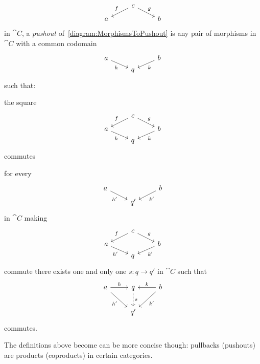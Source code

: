\begin{definition}
  \begin{equation}
    \begin{tikzcd}[row sep=tiny]
      & c \ar["f", dl, swap] \ar["g", dr] & \\
      a & & b
    \end{tikzcd}
    \label{diagram:MorphismsToPushout}\end{equation}
  in \(\cat C\), a {\em pushout} of~\eqref{diagram:MorphismsToPushout}
  is any pair of morphisms in \(\cat C\) with a common codomain
  \[\begin{tikzcd}[row sep=tiny]
      a \ar["h", dr, swap] & & b \ar["k", dl] \\
      & q &
    \end{tikzcd}\] such that:
  \begin{tcbitem}
  \item the square
    \[\begin{tikzcd}[row sep=tiny]
        & c \ar["f", dl, swap] \ar["g", dr] &                \\
        a \ar["h", dr, swap] &                                   & b \ar["k", dl] \\
        & q &
      \end{tikzcd}\] commutes
  \item for every
    \[\begin{tikzcd}[row sep=tiny]
        a \ar["{h'}", dr, swap] & & b \ar["{k'}", dl] \\
        & q' &
      \end{tikzcd}\] in \(\cat C\)
    making
    \[\begin{tikzcd}[row sep=tiny]
        & c \ar["f", dl, swap] \ar["g", dr] &                \\
        a \ar["{h'}", dr, swap] &                                   & b \ar["{k'}", dl] \\
        & q &
      \end{tikzcd}\] commute there exists one and only one
    \(s : q \to q'\) in \(\cat C\) such that
    \[\begin{tikzcd}
        a \ar["h", r] \ar["{h'}", dr, swap] & q \ar["s", d, dashed] & b \ar["k", l, swap] \ar["{k'}", dl] \\
        & q' &
      \end{tikzcd}\] commutes.
  \end{tcbitem}
\end{definition}

The definitions above become can be more concise though: pullbacks
(pushouts) are products (coproducts) in certain categories.

